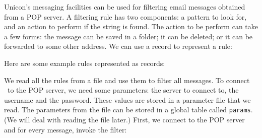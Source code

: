 Unicon's messaging facilities can be used for filtering
email messages obtained from a POP server. A filtering rule has two
components: a pattern to look for, and an action to perform if the
string is found. The action to be perform can take a few forms: the
message can be saved in a folder; it can be deleted; or it can be
forwarded to some other address. We can use a record to represent a
rule:


Here are some example rules represented as records:



\bigskip

We read all the rules from a file and use them to filter all messages.
To connect \ to the POP server, we need some parameters: the server to
connect to, the username and the password. These values are stored in a
parameter file that we read. The parameters from the file can be stored
in a global table called \texttt{params}. (We will deal with reading
the file later.) First, we connect to the POP server and for every
message, invoke the filter:



